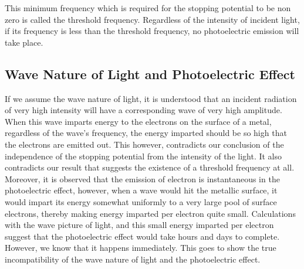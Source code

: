 \documentclass{article}
\begin{document}
This minimum frequency which is required for the stopping potential to be non zero is called the threshold frequency. Regardless of the intensity of incident light, if its frequency is less than the threshold frequency, no photoelectric emission will take place. 

\newpage 

\subsection{Wave Nature of Light and Photoelectric Effect}

If we assume the wave nature of light, it is understood that an incident radiation of very high intensity will have a corresponding wave of very high amplitude. When this wave imparts energy to the electrons on the surface of a metal, regardless of the wave's frequency, the energy imparted should be so high that the electrons are emitted out. This however, contradicts our conclusion of the independence of the stopping potential from the intensity of the light. It also contradicts our result that suggests the existence of a threshold frequency at all. Moreover, it is observed that the emission of electron is instantaneous in the photoelectric effect, however, when a wave would hit the metallic surface, it would impart its energy somewhat uniformly to a very large pool of surface electrons, thereby making energy imparted per electron quite small. Calculations with the wave picture of light, and this small energy imparted per electron suggest that the photoelectric effect would take hours and days to complete. However, we know that it happens immediately. This goes to show the true incompatibility of the wave nature of light and the photoelectric effect.
\end{document}
